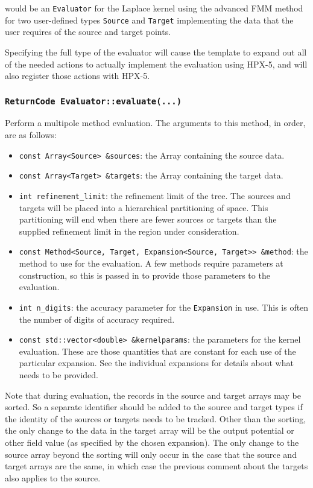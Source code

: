 \noindent would be an \texttt{Evaluator} for the Laplace kernel using the
advanced FMM method for two user-defined types
\texttt{Source} and \texttt{Target} implementing the data that the user
requires of the source and target points.

Specifying the full type of the evaluator will cause the template to expand
out all of the needed actions to actually implement the evaluation using
HPX-5, and will also register those actions with HPX-5.


\subsubsection{\texttt{ReturnCode Evaluator::evaluate(...)}}

Perform a multipole method evaluation. The arguments to this method, in order,
are as follows:

\begin{itemize}
\item \texttt{const Array<Source> \&sources}: the Array containing the source
  data.
\item \texttt{const Array<Target> \&targets}: the Array containing the target
  data.
\item \texttt{int refinement\_limit}: the refinement limit of the tree. The
  sources and  targets will be placed into a hierarchical partitioning of
  space. This partitioning will end when there are fewer sources or targets than
  the supplied refinement limit in the region under consideration.
\item \texttt{const Method<Source, Target, Expansion<Source, Target>> \&method}:
  the  method to use for the evaluation. A few methods require parameters at
  construction, so this is passed in to provide those parameters to the
  evaluation.
\item \texttt{int n\_digits}: the accuracy parameter for the \texttt{Expansion}
  in use. This is  often the number of digits of accuracy required.
\item \texttt{const std::vector<double> \&kernelparams}: the parameters for the
  kernel evaluation. These are those quantities that are constant for each use
  of the particular expansion. See
  the individual expansions for details about what needs to be provided.
\end{itemize}

Note that during evaluation, the records in the source and target arrays may be
sorted. So a separate identifier should be added to the source and target types
if the identity of the sources or targets needs to be tracked. Other than the
sorting, the only change to the data in the target array will be the output
potential or other field value (as specified by the chosen expansion). The
only change to the source array beyond the sorting will only occur in the case
that the source and target arrays are the same, in which case the previous
comment about the targets also applies to the source.

